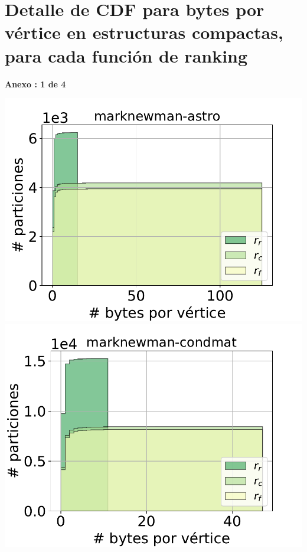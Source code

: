 \chapter{Detalle de CDF para bytes por vértice en estructuras compactas, para cada función de ranking}
\label{anexo:cdf}

\centering
\textbf{Anexo \thechapter:  1 de 4}
\begin{minipage}{1\textwidth}
    \centering
    \includegraphics[width=.9\linewidth]{img/cdf/marknewman-astro.pdf} \\
    \includegraphics[width=.9\linewidth]{img/cdf/marknewman-condmat.pdf} \\		
\end{minipage}

